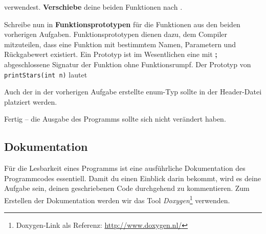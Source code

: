 verwendest.
\textbf{Verschiebe} deine beiden Funktionen nach .

Schreibe nun in  \textbf{Funktionsprototypen} für die Funktionen aus den beiden vorherigen Aufgaben.
Funktionsprototypen dienen dazu, dem Compiler mitzuteilen, dass eine Funktion mit bestimmtem Namen, Parametern und Rückgabewert existiert.
Ein Prototyp ist im Wesentlichen eine mit \textbf{;} abgeschlossene Signatur der Funktion ohne Funktionsrumpf.
Der Prototyp von \lstinline{printStars(int n)} lautet 



Auch der in der vorherigen Aufgabe erstellte enum-Typ sollte in der Header-Datei platziert werden.

Fertig -- die Ausgabe des Programms sollte sich nicht verändert haben.


\subsection{Dokumentation} \label{basics:doc}
Für die Lesbarkeit eines Programms ist eine ausführliche Dokumentation des Programmcodes essentiell.
Damit du einen Einblick darin bekommt, wird es deine Aufgabe sein, deinen geschriebenen Code durchgehend zu kommentieren. 
Zum Erstellen der Dokumentation werden wir das Tool \emph{Doxygen}\footnote{Doxygen-Link als Referenz: \url{http://www.doxygen.nl/}} verwenden.

